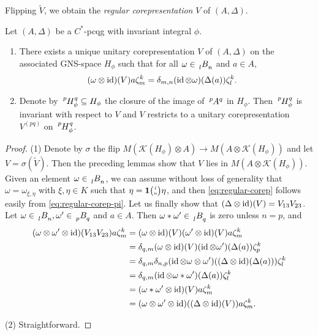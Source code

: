 Flipping $\tilde V$, we obtain the \emph{regular corepresentation} $V$ of $(A,\Delta)$.
 \begin{Prop}
Let $(A,\Delta)$ be a $C^{*}$-pcqg with invariant integral $\phi$.
\begin{enumerate}
\item  There exists a unique unitary corepresentation $V$ of  $(A,\Delta)$ on the associated GNS-space $H_{\phi}$ such that  for all
$\omega \in \Grd{B}{l}{n}$ and $a \in A$,
  \begin{align} \label{eq:regular-corep}
    (\omega \otimes \operatorname{id})(V) a\zeta^{k}_{m} &= \delta_{m,n} (\operatorname{id} \otimes \omega)(\Delta(a)) \zeta^{k}_{l}.
  \end{align}
\item Denote by $\Gr{H}{p}{q}{}{\phi}
  \subseteq H_{\phi}$ the closure of the image of  $\Gr{A}{p}{q}{}{}$ in $H_{\phi}$. Then  $\Gr{H}{p}{q}{}{\phi}$ is invariant with  respect to $V$ and $V$ restricts to a unitary corepresentation $V^{(pq)}$ on $\Gr{H}{p}{q}{}{\phi}$.
\end{enumerate}
 \end{Prop}
 \begin{proof}
(1)   Denote by $\sigma$ the flip $ M(\mathcal{K}(H_{\phi}) \otimes A) \to M(A
   \otimes \mathcal{K}(H_{\phi}))$ and let $V=\sigma(\tilde V)$. Then the   preceding lemmas show that $V$ lies in $M(A\otimes
   \mathcal{K}(H_{\phi}))$. Given an element $\omega \in \Grd{B}{l}{n}$, we can assume without loss of generality that $\omega=\omega_{\xi,\eta}$ with $\xi,\eta\in K$ such that $\eta=\mathbf{1}{\tiny {\begin{pmatrix} l\\n\end{pmatrix}}}\eta$, and then \eqref{eq:regular-corep} follows easily from \eqref{eq:regular-corep-pi}. Let us finally show that $(\Delta \otimes \operatorname{id})(V)=V_{13}V_{23}$. Let $\omega \in \Grd{B}{l}{n}, \omega' \in \Grd{B}{p}{q}$ and $a\in A$. Then
$\omega \ast\omega' \in \Grd{B}{l}{q}$ is zero unless $n=p$, and
   \begin{align*}
     (\omega \otimes \omega' \otimes \operatorname{id})(V_{13}V_{23})a\zeta^{k}_{m} &= (\omega \otimes \operatorname{id})(V)(\omega' \otimes \operatorname{id})(V) a\zeta^{k}_{m}\\
     &= \delta_{q,m} (\omega \otimes \operatorname{id})(V)(\operatorname{id} \otimes \omega')(\Delta(a))\zeta^{k}_{p} \\
     &= \delta_{q,m}\delta_{n,p}  (\operatorname{id} \otimes \omega \otimes \omega')((\Delta\otimes \operatorname{id})(\Delta(a)))\zeta^{k}_{l} \\
     &= \delta_{q,m} (\operatorname{id} \otimes \omega \ast \omega')(\Delta(a))\zeta^{k}_{l} \\
     &= (\omega\ast\omega' \otimes \operatorname{id})(V)a\zeta^{k}_{m} \\
     &= (\omega \otimes \omega' \otimes \operatorname{id})((\Delta \otimes \operatorname{id})(V))a\zeta^{k}_{m}.
   \end{align*}

(2) Straightforward.
 \end{proof}

